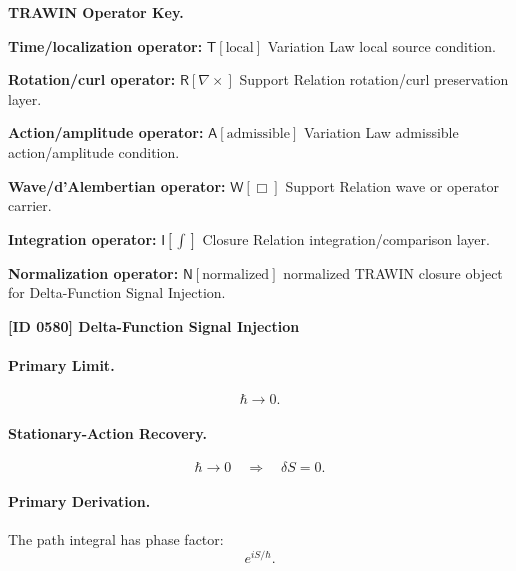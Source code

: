 \par\vspace{0.45\baselineskip}
\noindent\begin{minipage}[t]{\linewidth}
\begingroup
\small
\raggedright
\textbf{TRAWIN Operator Key.}\par
\noindent\textbf{Time/localization operator:} $\mathsf{T}\!\left[\mathrm{local}\right]$ Variation Law local source condition.\par
\noindent\textbf{Rotation/curl operator:} $\mathsf{R}\!\left[\nabla\times\right]$ Support Relation rotation/curl preservation layer.\par
\noindent\textbf{Action/amplitude operator:} $\mathsf{A}\!\left[\mathrm{admissible}\right]$ Variation Law admissible action/amplitude condition.\par
\noindent\textbf{Wave/d'Alembertian operator:} $\mathsf{W}\!\left[\Box\right]$ Support Relation wave or operator carrier.\par
\noindent\textbf{Integration operator:} $\mathsf{I}\!\left[\int\right]$ Closure Relation integration/comparison layer.\par
\noindent\textbf{Normalization operator:} $\mathsf{N}\!\left[\mathrm{normalized}\right]$ normalized TRAWIN closure object for Delta-Function Signal Injection.\par
\endgroup
\end{minipage}

\clearpage
\noindent\textbf{[ID 0580] Delta-Function Signal Injection}\par
\vspace{0.35em}
\paragraph{Primary Limit.}
\begin{equation}
\hbar\rightarrow 0 .
\end{equation}

\paragraph{Stationary-Action Recovery.}
\begin{equation}
\hbar\rightarrow 0
\quad\Longrightarrow\quad
\delta S=0 .
\end{equation}

\paragraph{Primary Derivation.}
The path integral has phase factor:
\begin{equation}
e^{iS/\hbar}.
\end{equation}

